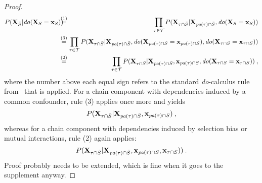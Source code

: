 \documentclass{article}
\newcommand{\vX}{\mathbf{X}}
\newcommand{\vx}{\mathbf{x}}
\newcommand{\dodo}{\mathit{do}}
\newcommand{\lvdo}[1]{\dodo(\vX_{#1} = \vx_{#1})}
\newcommand{\spa}{\mathop{\textit{\scriptsize pa}}}
\newcommand{\chaincomponents}{{\cal T}}
\newcommand{\isequaldo}[1]{\hspace*{-2.5mm} & \overset{(#1)}{=} & \hspace*{-2.5mm}}
\newcommand{\comment}[1]{{\color{red} #1}}
\begin{document}
\begin{proof}
\begin{eqnarray*}
	P(\vX_{\bar{S}}|\lvdo{S}) \isequaldo{1} \prod_{\tau \in \chaincomponents} P(\vX_{\tau \cap \bar{S}}|\vX_{\spa(\tau)  \cap \bar{S}},\lvdo{S}) \hfill \\
	\isequaldo{3}  \prod_{\tau \in \chaincomponents} P(\vX_{\tau \cap \bar{S}}|\vX_{\spa(\tau)  \cap \bar{S}},\lvdo{\spa(\tau) \cap S},\lvdo{\tau \cap S}) \\
	\isequaldo{2}  \prod_{\tau \in \chaincomponents} P(\vX_{\tau \cap \bar{S}}|\vX_{\spa(\tau)  \cap \bar{S}},\vx_{\spa(\tau) \cap S},\lvdo{\tau \cap S}) \: ,
\end{eqnarray*}
where the number above each equal sign refers to the standard \textit{do}-calculus rule from~\cite{pearl2012calculus} that is applied. For a chain component with dependencies induced by a common confounder, rule (3) applies once more and yields
\[
P(\vX_{\tau \cap \bar{S}}|\vX_{\spa(\tau)  \cap \bar{S}},\vx_{\spa(\tau) \cap S}) \: ,
\]
whereas for a chain component with dependencies induced by selection bias or mutual interactions, rule (2) again applies:
\[
P(\vX_{\tau \cap \bar{S}}|\vX_{\spa(\tau)  \cap \bar{S}},\vx_{ \spa(\tau) \cap S},\vx_{\tau \cap S})) \: .
\]
\comment{Proof probably needs to be extended, which is fine when it goes to the supplement anyway.}
\end{proof}
\end{document}
